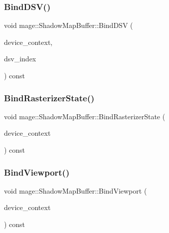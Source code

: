 \subsubsection{\texorpdfstring{Bind\+D\+S\+V()}{BindDSV()}}
{\footnotesize\ttfamily void mage\+::\+Shadow\+Map\+Buffer\+::\+Bind\+D\+SV (\begin{DoxyParamCaption}\item[{I\+D3\+D11\+Device\+Context2 $\ast$}]{device\+\_\+context,  }\item[{size\+\_\+t}]{dsv\+\_\+index }\end{DoxyParamCaption}) const\hspace{0.3cm}{\ttfamily [noexcept]}}

\hypertarget{structmage_1_1_shadow_map_buffer_ac85ec77ba5e39a1f50f59b6d4755c55b}{}\label{structmage_1_1_shadow_map_buffer_ac85ec77ba5e39a1f50f59b6d4755c55b} 
\subsubsection{\texorpdfstring{Bind\+Rasterizer\+State()}{BindRasterizerState()}}
{\footnotesize\ttfamily void mage\+::\+Shadow\+Map\+Buffer\+::\+Bind\+Rasterizer\+State (\begin{DoxyParamCaption}\item[{I\+D3\+D11\+Device\+Context2 $\ast$}]{device\+\_\+context }\end{DoxyParamCaption}) const\hspace{0.3cm}{\ttfamily [noexcept]}}

\hypertarget{structmage_1_1_shadow_map_buffer_a69c58ea895cf7cb9ef519f79927768bf}{}\label{structmage_1_1_shadow_map_buffer_a69c58ea895cf7cb9ef519f79927768bf} 
\subsubsection{\texorpdfstring{Bind\+Viewport()}{BindViewport()}}
{\footnotesize\ttfamily void mage\+::\+Shadow\+Map\+Buffer\+::\+Bind\+Viewport (\begin{DoxyParamCaption}\item[{I\+D3\+D11\+Device\+Context2 $\ast$}]{device\+\_\+context }\end{DoxyParamCaption}) const\hspace{0.3cm}{\ttfamily [noexcept]}}

